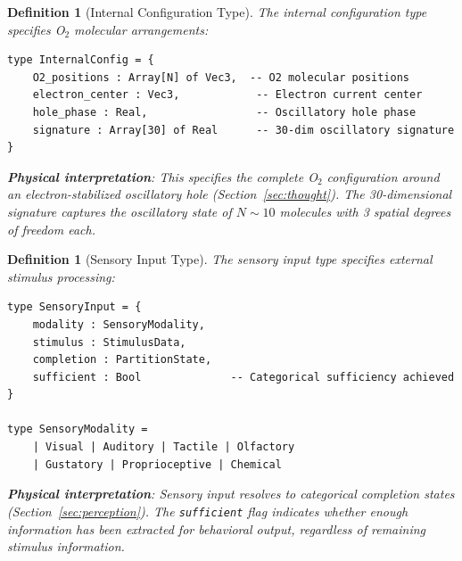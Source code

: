 \documentclass[aps,prd,twocolumn,superscriptaddress,floatfix,nofootinbib]{revtex4-2}
\newtheorem{definition}[theorem]{Definition}
\theoremstyle{remark}
\begin{document}
\begin{definition}[Internal Configuration Type]
\label{def:config_type}
The internal configuration type specifies O$_2$ molecular arrangements:
\begin{verbatim}
type InternalConfig = {
    O2_positions : Array[N] of Vec3,  -- O2 molecular positions
    electron_center : Vec3,            -- Electron current center
    hole_phase : Real,                 -- Oscillatory hole phase
    signature : Array[30] of Real      -- 30-dim oscillatory signature
}
\end{verbatim}

\textbf{Physical interpretation}: This specifies the complete O$_2$ configuration around an electron-stabilized oscillatory hole (Section~\ref{sec:thought}). The 30-dimensional signature captures the oscillatory state of $N \sim 10$ molecules with 3 spatial degrees of freedom each.
\end{definition}

\begin{definition}[Sensory Input Type]
\label{def:perception_type}
The sensory input type specifies external stimulus processing:
\begin{verbatim}
type SensoryInput = {
    modality : SensoryModality,
    stimulus : StimulusData,
    completion : PartitionState,
    sufficient : Bool              -- Categorical sufficiency achieved
}

type SensoryModality =
    | Visual | Auditory | Tactile | Olfactory
    | Gustatory | Proprioceptive | Chemical
\end{verbatim}

\textbf{Physical interpretation}: Sensory input resolves to categorical completion states (Section~\ref{sec:perception}). The \texttt{sufficient} flag indicates whether enough information has been extracted for behavioral output, regardless of remaining stimulus information.
\end{definition}
\end{document}
